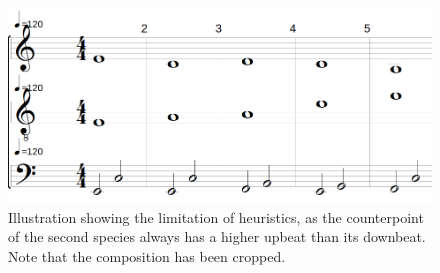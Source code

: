 \begin{figure}[h]
  \centering
  \includegraphics[width=.6\textwidth]{Images/limitation-with-lowest-array.png}
  \caption{Illustration showing the limitation of heuristics, as the counterpoint of the second species always has a higher upbeat than its downbeat. Note that the composition has been cropped.}
  \label{fig:limitation-lowest-array}
\end{figure}




